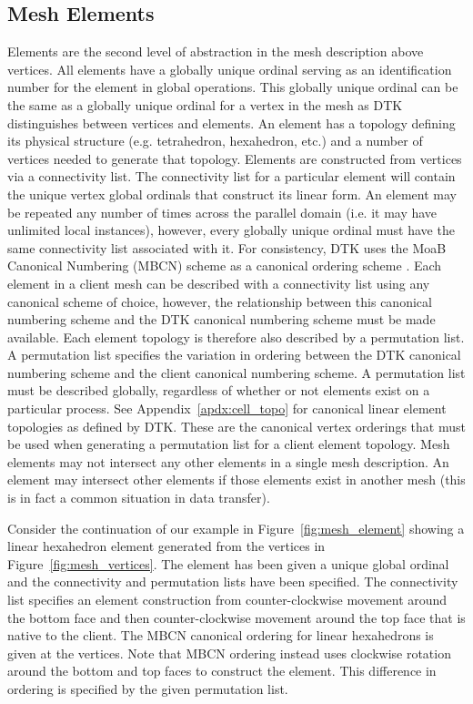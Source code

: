 \documentclass[letterpaper,12pt]{article}
\begin{document}
\subsection{Mesh Elements}\label{subsec:elements}
Elements are the second level of abstraction in the mesh description
above vertices. All elements have a globally unique ordinal serving as
an identification number for the element in global operations. This
globally unique ordinal can be the same as a globally unique ordinal
for a vertex in the mesh as DTK distinguishes between vertices and
elements. An element has a topology defining its physical structure
(e.g. tetrahedron, hexahedron, etc.) and a number of vertices needed
to generate that topology. Elements are constructed from vertices via
a connectivity list. The connectivity list for a particular element
will contain the unique vertex global ordinals that construct its
linear form. An element may be repeated any number of times across the
parallel domain (i.e. it may have unlimited local instances), however,
every globally unique ordinal must have the same connectivity list
associated with it. For consistency, DTK uses the MoaB Canonical
Numbering (MBCN) scheme as a canonical ordering scheme
\cite{Tautges_2009}. Each element in a client mesh can be described
with a connectivity list using any canonical scheme of choice,
however, the relationship between this canonical numbering scheme and
the DTK canonical numbering scheme must be made available. Each
element topology is therefore also described by a permutation list. A
permutation list specifies the variation in ordering between the DTK
canonical numbering scheme and the client canonical numbering
scheme. A permutation list must be described globally, regardless of
whether or not elements exist on a particular process. See
Appendix~\ref{apdx:cell_topo} for canonical linear element topologies
as defined by DTK. These are the canonical vertex orderings that must
be used when generating a permutation list for a client element
topology. Mesh elements may not intersect any other elements in a
single mesh description. An element may intersect other elements if
those elements exist in another mesh (this is in fact a common
situation in data transfer).

Consider the continuation of our example in
Figure~\ref{fig:mesh_element} showing a linear hexahedron element
generated from the vertices in Figure~\ref{fig:mesh_vertices}. The
element has been given a unique global ordinal and the connectivity
and permutation lists have been specified. The connectivity list
specifies an element construction from counter-clockwise movement
around the bottom face and then counter-clockwise movement around the
top face that is native to the client. The MBCN canonical ordering for
linear hexahedrons is given at the vertices. Note that MBCN ordering
instead uses clockwise rotation around the bottom and top faces to
construct the element. This difference in ordering is specified by the
given permutation list.
\end{document}
